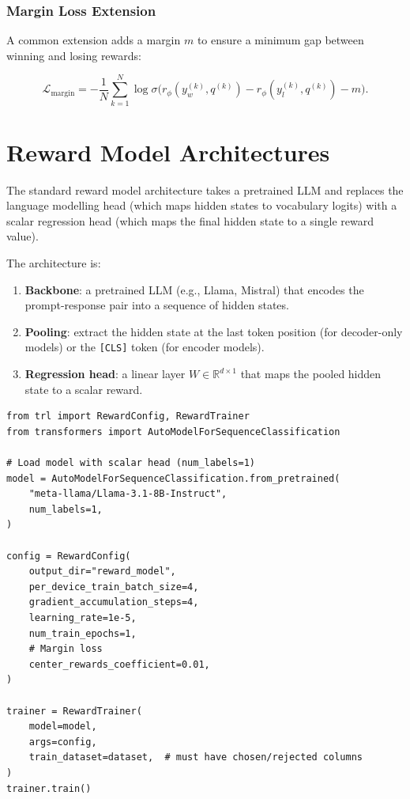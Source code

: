\subsubsection*{Margin Loss Extension}
\label{margin-loss-extension}

A common extension adds a margin $m$ to ensure a minimum gap between winning and losing rewards:

\[
\mathcal{L}_{\text{margin}} =
    -\frac{1}{N}\sum_{k=1}^N \log \sigma\!\bigl(r_\phi(y_w^{(k)}, q^{(k)}) - r_\phi(y_l^{(k)}, q^{(k)}) - m\bigr).
\]

\section{Reward Model Architectures}
\label{sec:rm-architectures}

\begin{intuitionbox}
The standard reward model architecture takes a pretrained LLM and replaces the language modelling head (which maps hidden states to vocabulary logits) with a scalar regression head (which maps the final hidden state to a single reward value).
\end{intuitionbox}

The architecture is:

\begin{enumerate}
  \item \textbf{Backbone}: a pretrained LLM (e.g., Llama, Mistral) that encodes the prompt-response pair into a sequence of hidden states.
  \item \textbf{Pooling}: extract the hidden state at the last token position (for decoder-only models) or the \texttt{[CLS]} token (for encoder models).
  \item \textbf{Regression head}: a linear layer $W \in \mathbb{R}^{d \times 1}$ that maps the pooled hidden state to a scalar reward.
\end{enumerate}

\begin{examplebox}
\begin{lstlisting}[style=pythonstyle]
from trl import RewardConfig, RewardTrainer
from transformers import AutoModelForSequenceClassification

# Load model with scalar head (num_labels=1)
model = AutoModelForSequenceClassification.from_pretrained(
    "meta-llama/Llama-3.1-8B-Instruct",
    num_labels=1,
)

config = RewardConfig(
    output_dir="reward_model",
    per_device_train_batch_size=4,
    gradient_accumulation_steps=4,
    learning_rate=1e-5,
    num_train_epochs=1,
    # Margin loss
    center_rewards_coefficient=0.01,
)

trainer = RewardTrainer(
    model=model,
    args=config,
    train_dataset=dataset,  # must have chosen/rejected columns
)
trainer.train()
\end{lstlisting}
\end{examplebox}

